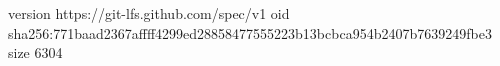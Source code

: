 version https://git-lfs.github.com/spec/v1
oid sha256:771baad2367affff4299ed28858477555223b13bcbca954b2407b7639249fbe3
size 6304
